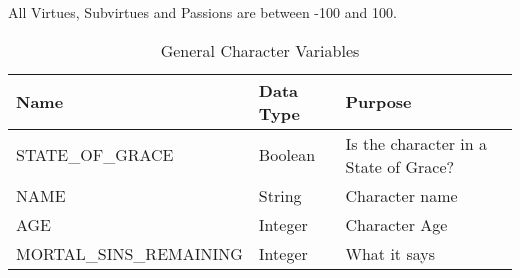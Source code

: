 \documentclass[10pt]{article}
\begin{document}
All Virtues, Subvirtues and Passions are between -100 and 100. 

\begin{longtable}{| p{6cm} | p{3cm} | p{10cm} |}
\caption{General Character Variables}
\label{tab:General Character}\\
\hline 
\textbf{Name} & \textbf{Data Type} & \textbf{Purpose} \\
\hline
STATE\_OF\_GRACE & Boolean & Is the character in a State of Grace? \\
\hline
NAME & String & Character name \\
\hline
AGE & Integer & Character Age \\
\hline
MORTAL\_SINS\_REMAINING & Integer & What it says \\
\hline

\end{longtable}
\end{document}
